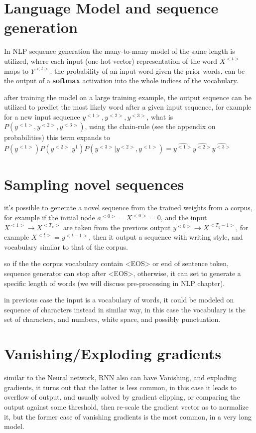 \documentclass[4apaper,12pt]{book}
\begin{document}
\begin{description}
    \section{Language Model and sequence generation}
    \begin{description}
    \item In NLP sequence generation the many-to-many model of the same length is utilized, where each input (one-hot vector) representation of the word $X^{<t>}$ maps to $Y^{<t>}$: the probability of an input word given the prior words, can be the output of a \textbf{softmax} activation into the whole indices of the vocabulary.
    \item after training the model on a large training example, the output sequence can be utilized to predict the most likely word after a given input sequence, for example for a new input sequence $y^{<1>}, y^{<2>}, y^{<3>}$, what is $P(y^{<1>}, y^{<2>}, y^{<3>})$, using the chain-rule (see the appendix on probabilities) this term expands to $P(y^{<1>})P(y^{<2>}|y^{1})P(y^{<3>}|y^{<2>},y^{<1>})=\hat{y^{<1>}}\hat{y^{<2>}}\hat{y^{<3>}}$
    \end{description}
    \section{Sampling novel sequences}
    \begin{description}
    \item it's possible to generate a novel sequence from the trained weights from a corpus, for example if the initial node $a^{<0>}=X^{<0>}=0$, and the input $X^{<1>} \to X^{<T_x>}$ are taken from the previous output $y^{<0>} \to X^{<T_y-1>}$, for example $X^{<t>}=y^{<t-1>}$, then it output a sequence with writing style, and vocabulary similar to that of the corpus.
    \item so if the the corpus vocabulary contain <EOS> or end of sentence token, sequence generator can stop after <EOS>, otherwise, it can set to generate a specific length of words (we will discuss pre-processing in NLP chapter).
    \item in previous case the input is a vocabulary of words, it could be modeled on sequence of characters instead in similar way, in this case the vocabulary is the set of characters, and numbers, white space, and possibly punctuation.
    \end{description}
    \section{Vanishing/Exploding gradients}
    \begin{description}
    \item similar to the Neural network, RNN also can have Vanishing, and exploding gradients, it turns out that the latter is less common, in this case it leads to overflow of output, and usually solved by gradient clipping, or comparing the output against some threshold, then re-scale the gradient vector as to normalize it, but the former case of vanishing gradients is the most common, in a very long model.

\end{description}
\end{description}
\end{document}
